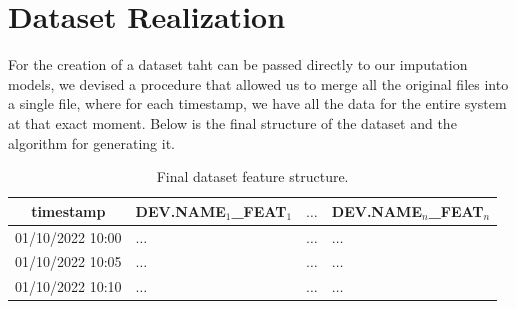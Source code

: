 \section{Dataset Realization}

For the creation of a dataset taht can be passed directly to our imputation models, we devised a procedure that
allowed us to merge all the original files into a single file, where for
each timestamp, we have all the data for the entire system at
that exact moment. Below is the final structure of the dataset
and the algorithm for generating it.



\begin{table}[H]
	\begin{center}
		\begin{tabular}[c]{l|l|l|l}
			\multicolumn{1}{c|}{\textbf{timestamp}}              &
			\multicolumn{1}{c|}{\textbf{DEV.NAME$_1$\_FEAT$_1$}} &
			\multicolumn{1}{c|}{$\ldots$}                        &
			\multicolumn{1}{c}{\textbf{DEV.NAME$_n$\_FEAT$_n$}}                                   \\
			\hline

			01/10/2022 10:00                                     & $\ldots$ & $\ldots$ & $\ldots$ \\
			01/10/2022 10:05                                     & $\ldots$ & $\ldots$ & $\ldots$ \\
			01/10/2022 10:10                                     & $\ldots$ & $\ldots$ & $\ldots$ \\
		\end{tabular}
	\end{center}
	\caption{Final dataset feature structure.}\label{tab:datasetform}
\end{table}

